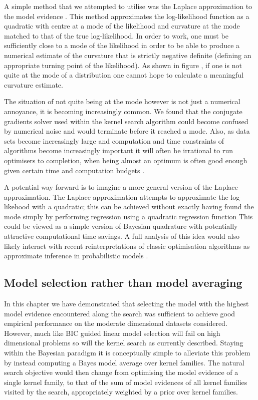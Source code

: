 A simple method that we attempted to utilise was the Laplace approximation to the model evidence .
This method approximates the log-likelihood function as a quadratic with centre at a mode of the likelihood and curvature at the mode matched to that of the true log-likelihood.
In order to work, one must be sufficiently close to a mode of the likelihood in order to be able to produce a numerical estimate of the curvature that is strictly negative definite (\ie defining an appropriate turning point of the likelihood).
As shown in figure , if one is not quite at the mode of a distribution one cannot hope to calculate a meaningful curvature estimate.

The situation of not quite being at the mode however is not just a numerical annoyance, it is becoming increasingly common.
We found that the conjugate gradients solver used within the kernel search algorithm could become confused by numerical noise and would terminate before it reached a mode.
Also, as data sets become increasingly large and computation and time constraints of algorithms become increasingly important it will often be irrational to run optimisers to completion, when being almost an optimum is often good enough given certain time and computation budgets .

A potential way forward is to imagine a more general version of the Laplace approximation.
The Laplace approximation attempts to approximate the log-likehood with a quadratic; this can be achieved without exactly having found the mode simply by performing regression using a quadratic regression function
This could be viewed as a simple version of Bayesian quadrature  with potentially attractive computational time savings.
A full analysis of this idea would also likely interact with recent reinterpretations of classic optimisation algorithms as approximate inference in probabilistic models .

\subsection{Model selection rather than model averaging}

In this chapter we have demonstrated that selecting the model with the highest model evidence encountered along the search was sufficient to achieve good empirical performance on the moderate dimensional datasets considered.
However, much like BIC guided linear model selection will fail on high dimensional problems  so will the kernel search as currently described.
Staying within the Bayesian paradigm it is conceptually simple to alleviate this problem by instead computing a Bayes model average  over kernel families.
The natural search objective would then change from optimising the model evidence of a single kernel family, to that of the sum of model evidences of all kernel families visited by the search, appropriately weighted by a prior over kernel families.

\outbpdocument{


}

